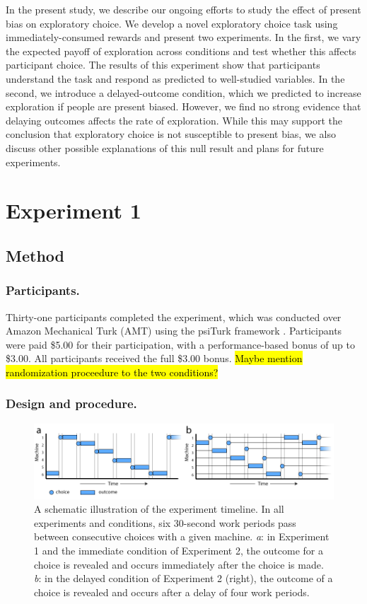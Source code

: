 \documentclass[10pt,letterpaper]{article}
\begin{document}
In the present study, we describe our ongoing efforts to study the effect of present bias
on exploratory choice. We develop a novel exploratory choice task using
immediately-consumed rewards and present two experiments. In the first, we vary
the expected payoff of exploration across conditions and test whether this affects
participant choice. The results of this experiment show that participants understand the task and respond
as predicted to well-studied variables. In the second, we introduce a
delayed-outcome condition, which we predicted to increase exploration
if people are present biased. However, we find no strong evidence that delaying outcomes affects
the rate of exploration. While this may support the conclusion that exploratory
choice is not susceptible to present bias, we also discuss other possible
explanations of this null result and plans for future experiments.

\section{Experiment 1}

\subsection{Method}

\subsubsection{Participants.}

Thirty-one participants completed the experiment, which was conducted over
Amazon Mechanical Turk (AMT) using the psiTurk framework \citep{Gureckis2015a}.
Participants were paid \$5.00 for their participation, with a performance-based
bonus of up to \$3.00. All participants received the full \$3.00 bonus.
\hl{Maybe mention randomization proceedure to the two conditions?}

\subsubsection{Design and procedure.}


\begin{figure}
\centering
\includegraphics[width=\textwidth]{figures/machinetimeline.png}
\caption{A schematic illustration of the experiment timeline. In all experiments
  and conditions, six 30-second work periods pass between consecutive choices
  with a given machine. \emph{a}: in Experiment 1 and the immediate condition of
  Experiment 2, the outcome for a choice is revealed and occurs immediately
  after the choice is made. \emph{b}: in the delayed condition of Experiment 2 (right),
  the outcome of a choice is revealed and occurs after a delay of four work
  periods.}
\label{fig:machinetimeline}
\end{figure}
\end{document}
